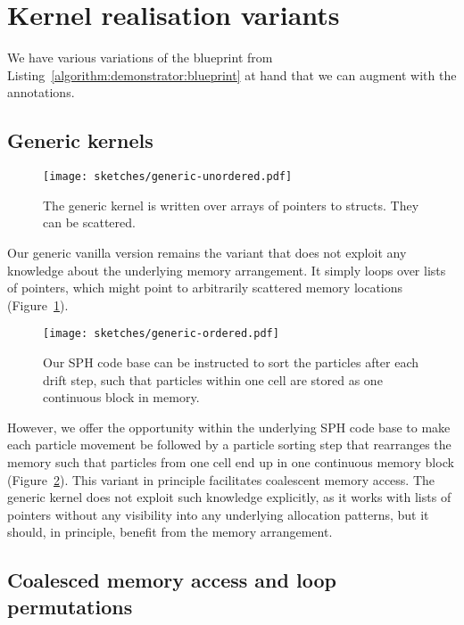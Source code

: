\section{Kernel realisation variants}
\label{section:realisation-variants}

We have various variations of the blueprint from Listing~\ref{algorithm:demonstrator:blueprint} at hand that we can augment with the annotations.


\subsection{Generic kernels}

\begin{figure}[htb]
\centering
 \texttt{[image: sketches/generic-unordered.pdf]}
 \caption{
   The generic kernel is written over arrays of pointers to structs.
   They can be scattered.
   \label{sketches:memlayout:unordered}
 }
\end{figure}


Our generic vanilla version remains the variant that does not exploit any knowledge about the underlying memory arrangement.
It simply loops over lists of pointers, which might point to arbitrarily scattered memory locations (Figure~\ref{sketches:memlayout:unordered}).


\begin{figure}[htb]
\centering
 \texttt{[image: sketches/generic-ordered.pdf]}
 \caption{
  Our SPH code base can be instructed to sort the particles after each drift step, such that particles within one cell are stored as one continuous block in memory.
  \label{sketches:memlayout:ordrered}
 }  
\end{figure}


However, we offer the opportunity within the underlying SPH code base to make each particle movement be followed by a particle sorting step that rearranges the memory such that particles from one cell end up in one continuous memory block (Figure~\ref{sketches:memlayout:ordrered}).
This variant in principle facilitates coalescent memory access.
The generic kernel does not exploit such knowledge explicitly, as it works with lists of pointers without any visibility into any underlying allocation patterns, but it should, in principle, benefit from the memory arrangement.


\subsection{Coalesced memory access and loop permutations}

